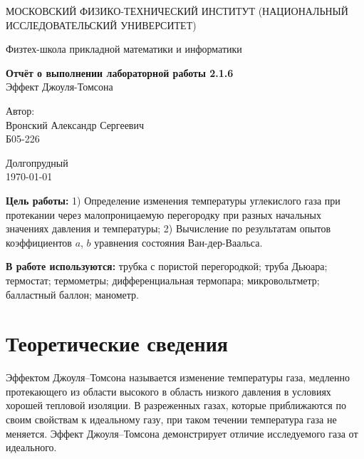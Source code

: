 \documentclass[a4paper,12pt]{article}
\date{\today}
\begin{document}
\begin{titlepage}
	\begin{center}
		{\large МОСКОВСКИЙ ФИЗИКО-ТЕХНИЧЕСКИЙ ИНСТИТУТ (НАЦИОНАЛЬНЫЙ ИССЛЕДОВАТЕЛЬСКИЙ УНИВЕРСИТЕТ)}
	\end{center}
	\begin{center}
		{\large Физтех-школа прикладной математики и информатики}
	\end{center}


	\vspace{4.5cm}
	{\huge
		\begin{center}
			{\bf Отчёт о выполнении лабораторной работы 2.1.6}\\
      Эффект Джоуля-Томсона
		\end{center}
	}
	\vspace{2cm}
	\begin{flushright}
		{\LARGE Автор:\\ Вронский Александр Сергеевич \\
			\vspace{0.2cm}
			Б05-226}
	\end{flushright}
	\vspace{8cm}
	\begin{center}
		Долгопрудный\\
		\today
	\end{center}
\end{titlepage}

\textbf{Цель работы:} 1) Определение изменения температуры углекислого газа при протекании через малопроницаемую перегородку при разных начальных значениях давления и температуры; 2) Вычисление по результатам опытов коэффициентов $a$, $b$ уравнения состояния Ван-дер-Ваальса.

\textbf{В работе используются:} трубка с пористой перегородкой; труба Дьюара; термостат; термометры; дифференциальная термопара; микровольтметр; балластный баллон; манометр.

\section{Теоретические сведения}

  Эффектом Джоуля–Томсона называется изменение температуры газа, медленно протекающего из области высокого в область низкого давления в условиях хорошей тепловой изоляции. В разреженных газах, которые приближаются по своим свойствам к идеальному газу, при таком течении температура газа не меняется. Эффект Джоуля–Томсона демонстрирует отличие исследуемого газа от идеального.
\end{document}
